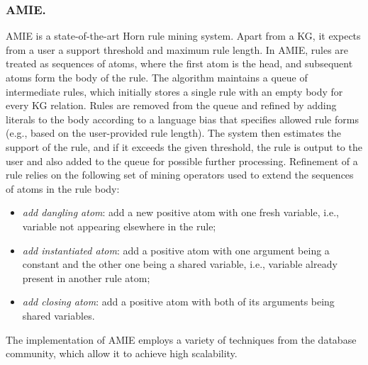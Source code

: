 \subsubsection{AMIE.}
AMIE \cite{amie} is a state-of-the-art Horn rule mining system.
Apart from a KG, it expects from a user a support threshold and maximum
rule length. In AMIE, rules are treated as sequences of atoms, where the first atom is the head, and subsequent atoms form the body of the rule. The algorithm maintains a queue of intermediate rules, which initially stores a single rule with an empty body for every KG relation. 
Rules are removed from the queue and refined by adding literals to the body according to a language bias that specifies allowed rule forms (e.g., based on the user-provided rule length). The system then estimates the support of the rule, and if it exceeds the given threshold, the rule is output to the user and also added to the queue for
possible further processing.
Refinement of a rule relies on the following set of mining operators used to extend the sequences of atoms in the rule body:
\begin{itemize}
\item \textit{add dangling atom}: add a new positive atom with one fresh variable, i.e., variable not appearing elsewhere in the rule;
\item \textit{add instantiated atom}: add a positive atom with one argument being a constant and the other one being a shared variable, i.e., variable already present in another rule atom;
\item \textit{add closing atom}:  add a positive atom with both of its arguments being shared variables.

\end{itemize}

The implementation of AMIE employs a variety of techniques from the database community, which allow it to achieve high scalability.

